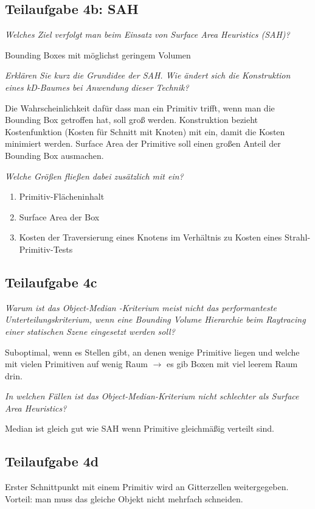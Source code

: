\documentclass[a4paper]{scrartcl}
\begin{document}
\subsection*{Teilaufgabe 4b: SAH}
\textit{Welches Ziel verfolgt man beim Einsatz von Surface Area Heuristics (SAH)?}

Bounding Boxes mit möglichst geringem Volumen

\textit{Erklären Sie kurz die Grundidee der SAH. Wie ändert sich die
Konstruktion eines kD-Baumes bei Anwendung dieser Technik?}

Die Wahrscheinlichkeit dafür dass man ein Primitiv trifft, wenn man die
Bounding Box getroffen hat, soll groß werden. Konstruktion bezieht
Kostenfunktion (Kosten für Schnitt mit Knoten) mit ein, damit die Kosten
minimiert werden. Surface Area der Primitive soll einen großen Anteil der
Bounding Box ausmachen.

\textit{Welche Größen fließen dabei zusätzlich mit ein?}
\begin{enumerate}[label=(\arabic*)]
    \item Primitiv-Flächeninhalt
    \item Surface Area der Box
    \item Kosten der Traversierung eines Knotens im Verhältnis zu Kosten eines Strahl-Primitiv-Tests
\end{enumerate}

\subsection*{Teilaufgabe 4c}
\textit{Warum ist das Object-Median -Kriterium meist nicht das performanteste
Unterteilungskriterium, wenn eine Bounding Volume Hierarchie beim Raytracing
einer statischen Szene eingesetzt werden soll?}

Suboptimal, wenn es Stellen gibt, an denen wenige Primitive liegen und welche
mit vielen Primitiven auf wenig Raum $\rightarrow$ es gib Boxen mit viel leerem
Raum drin.

\textit{In welchen Fällen ist das Object-Median-Kriterium nicht schlechter als
Surface Area Heuristics?}

Median ist gleich gut wie SAH wenn Primitive gleichmäßig verteilt
sind.

\subsection*{Teilaufgabe 4d}
Erster Schnittpunkt mit einem Primitiv wird an Gitterzellen weitergegeben.
Vorteil: man muss das gleiche Objekt nicht mehrfach schneiden.
\end{document}
